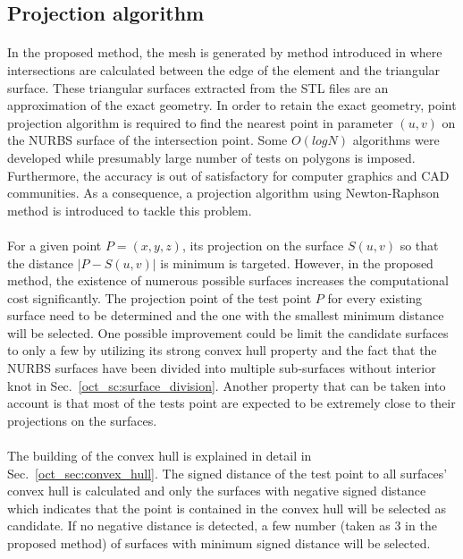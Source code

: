 \subsection{Projection algorithm}
\paragraph{}
In the proposed method, the mesh is generated by method introduced in \cite{Liu2017} where intersections are calculated between the edge of the element and the triangular surface.
These triangular surfaces extracted from the STL files are an approximation of the exact geometry.
In order to retain the exact geometry, point projection algorithm is required to find the nearest point in parameter $(u, v)$ on the NURBS surface of the intersection point.
Some $O(logN)$ algorithms were developed \citep{Edelsbrunner:1985:CED:4007.4011, Chin1983OptimalAF} while presumably large number of tests on polygons is imposed.
Furthermore, the accuracy is out of satisfactory for computer graphics and CAD communities.
As a consequence, a projection algorithm \citep{MA200379} using Newton-Raphson method is introduced to tackle this problem.

\paragraph{}
For a given point $P=(x,y,z)$, its projection on the surface $S(u, v)$ so that the distance $|P-S(u,v)|$ is minimum is targeted.
However, in the proposed method, the existence of numerous possible surfaces increases the computational cost significantly.
The projection point of the test point $P$ for every existing surface need to be determined and the one with the smallest minimum distance will be selected.
One possible improvement could be limit the candidate surfaces to only a few by utilizing its strong convex hull property and the fact that the NURBS surfaces have been divided into multiple sub-surfaces without interior knot in Sec.~\ref{oct_sc:surface_division}.
Another property that can be taken into account is that most of the tests point are expected to be extremely close to their projections on the surfaces.

\paragraph{}
The building of the convex hull is explained in detail in Sec.~\ref{oct_sec:convex_hull}.
The signed distance of the test point to all surfaces' convex hull is calculated and only the surfaces with negative signed distance which indicates that the point is contained in the convex hull will be selected as candidate.
If no negative distance is detected, a few number (taken as $3$ in the proposed method) of surfaces with minimum signed distance will be selected.

